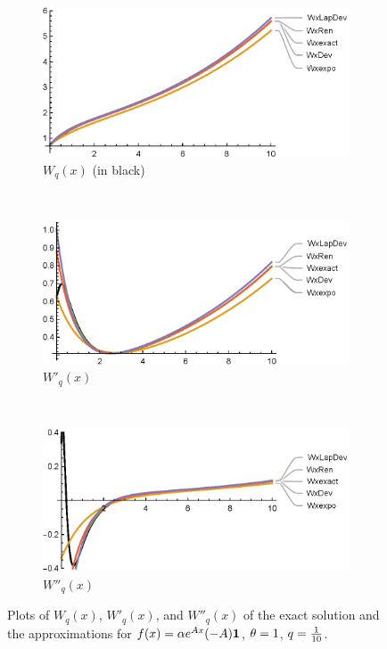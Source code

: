 \begin{figure}[!h]
    \centering
    \begin{subfigure}[b]{0.8\textwidth}
        \includegraphics[width=\textwidth]{MatExp6220W}
        \caption{$W_q(x)$  (in black)}
        \label{fig:MatExp6220W}
    \end{subfigure}
    ~
    \\
    \begin{subfigure}[b]{0.8\textwidth}
        \includegraphics[width=\textwidth]{MatExp6220W1}
        \caption{$W'_q(x)$}
        \label{fig:MatExp6220W1}
    \end{subfigure}
    ~
    \\
    \begin{subfigure}[b]{0.8\textwidth}
        \includegraphics[width=\textwidth]{MatExp6220W2}
        \caption{$W''_q(x)$}
        \label{fig:MatExp6220W2}
    \end{subfigure}
    \caption{Plots of $W_q(x)$, $W'_q(x)$, and $W''_q(x)$ of the exact solution and the approximations for $f(x)=\alpha e^{A x} (-A) {\mbox{\boldmath$1$}} $, $\theta=1$, $q=\frac{1}{10}$.}\label{fig:MatExp6220}
\end{figure}


